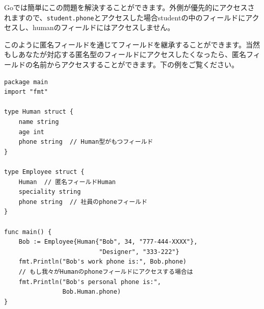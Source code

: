 Goでは簡単にこの問題を解決することができます。外側が優先的にアクセスされますので、\texttt{student.phone}とアクセスした場合studentの中のフィールドにアクセスし、humanのフィールドにはアクセスしません。

このように匿名フィールドを通じてフィールドを継承することができます。当然もしあなたが対応する匿名型のフィールドにアクセスしたくなったら、匿名フィールドの名前からアクセスすることができます。下の例をご覧ください。

\begin{lstlisting}[numbers=none]
package main
import "fmt"

type Human struct {
    name string
    age int
    phone string  // Human型がもつフィールド
}

type Employee struct {
    Human  // 匿名フィールドHuman
    speciality string
    phone string  // 社員のphoneフィールド
}

func main() {
    Bob := Employee{Human{"Bob", 34, "777-444-XXXX"},
                          "Designer", "333-222"}
    fmt.Println("Bob's work phone is:", Bob.phone)
    // もし我々がHumanのphoneフィールドにアクセスする場合は
    fmt.Println("Bob's personal phone is:",
                Bob.Human.phone)
}
\end{lstlisting}


